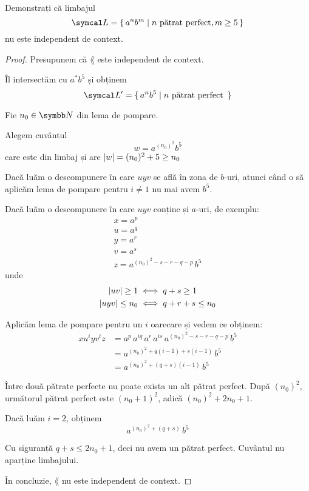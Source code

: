 \begin{exercise}
    Demonstrați că limbajul
    \[\lang = \set{ a^n b^m | n \text{ pătrat perfect}, m \geq 5 }\]
    nu este independent de context.
\end{exercise}
\begin{proof}
    Presupunem că \(\lang\) este independent de context.

    Îl intersectăm cu \(a^* b^5\) și obținem
    \[\lang' = \set{ a^n b^5 | n \text{ pătrat perfect } }\]

    Fie \(n_0 \in \naturals\) din lema de pompare.

    Alegem cuvântul
    \[w = a^{(n_0)^2} b^5\]
    care este din limbaj și are \(\left\lvert w\right\rvert = (n_0)^2 + 5 \geq n_0\)

    Dacă luăm o descompunere în care \(u y v\) se află în zona de \(b\)-uri, atunci când o să aplicăm lema de pompare pentru \(i \neq 1\) nu mai avem \(b^5\).

    Dacă luăm o descompunere în care \(u y v\) conține și \(a\)-uri, de exemplu:
    \begin{gather*}
        x = a^p \\
        u = a^q \\
        y = a^r \\
        v = a^s \\
        z = a^{(n_0)^2 - s - r - q - p} \, b^5
    \end{gather*}
    unde
    \begin{align*}
        \left\lvert uv\right\rvert \geq 1      & \iff q + s \geq 1       \\
        \left\lvert u y v\right\rvert \leq n_0 & \iff q + r + s \leq n_0
    \end{align*}

    Aplicăm lema de pompare pentru un \(i\) oarecare și vedem ce obținem:
    \begin{align*}
        x u^i y v^i z & = a^p \, a^{iq} \, a^r \, a^{is} \, a^{(n_0)^2 - s - r - q - p} \, b^5 \\
                      & = a^{(n_0)^2 + q (i - 1) + s (i - 1)} \, b^5                           \\
                      & = a^{(n_0)^2 + (q + s) (i - 1)} \, b^5
    \end{align*}

    Între două pătrate perfecte nu poate exista un alt pătrat perfect. După \((n_0)^2\), următorul pătrat perfect este \((n_0 + 1)^2\), adică \((n_0)^2 + 2 n_0 + 1\).

    Dacă luăm \(i = 2\), obținem
    \[a^{(n_0)^2 + (q + s)} \, b^5\]

    Cu siguranță \(q + s \leq 2 n_0 + 1\), deci nu avem un pătrat perfect. Cuvântul nu aparține limbajului.

    În concluzie, \(\lang\) nu este independent de context.
\end{proof}

